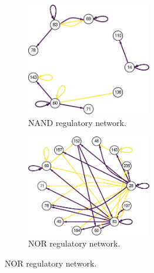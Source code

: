 \begin{figure}
\begin{subfigure}[b]{0.5\textwidth}
    \centering
    \includegraphics[width=0.6\textwidth]{chapters/05-tag-based-genetic-regulation/media/boolean-calc-prefix-networks/case-study-id-24400-test-420-network-cropped.png}
    \caption{\small NAND regulatory network.}
    \label{chapter:tag-based-regulation:subfig:bc-nand-reg-network}
\end{subfigure}%
\hfill
\begin{subfigure}[b]{0.5\textwidth}
    \centering
    \includegraphics[width=0.6\textwidth]{chapters/05-tag-based-genetic-regulation/media/boolean-calc-prefix-networks/case-study-id-24400-test-134-network-cropped.png}
    \caption{\small NOR regulatory network.}
    \label{chapter:tag-based-regulation:subfig:bc-nor-reg-network}
\end{subfigure}%


\end{figure}
